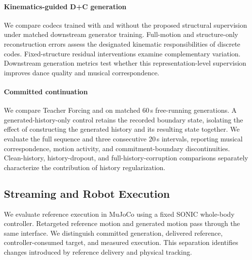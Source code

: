 
\paragraph{Kinematics-guided D+C generation}
We compare codecs trained with and without the proposed
structural supervision under matched downstream
generator training.
Full-motion and structure-only reconstruction errors
assess the designated kinematic responsibilities
of discrete codes.
Fixed-structure residual interventions examine
complementary variation.
Downstream generation metrics test whether this
representation-level supervision improves dance quality
and musical correspondence.


\paragraph{Committed continuation}
We compare Teacher Forcing and \cof{} on matched
60\,s free-running generations.
A generated-history-only control retains the recorded
boundary state, isolating the effect of constructing
the generated history and its resulting state together.
We evaluate the full sequence and three consecutive
20\,s intervals, reporting musical correspondence,
motion activity, and commitment-boundary discontinuities.
Clean-history, history-dropout, and full-history-corruption
comparisons separately characterize the contribution
of history regularization.


\subsection{Streaming and Robot Execution}
\label{sec:execution_results}

We evaluate reference execution in MuJoCo using a fixed
SONIC whole-body controller.
Retargeted reference motion and generated motion pass
through the same interface.
We distinguish committed generation, delivered reference,
controller-consumed target, and measured execution.
This separation identifies changes introduced by reference
delivery and physical tracking.

